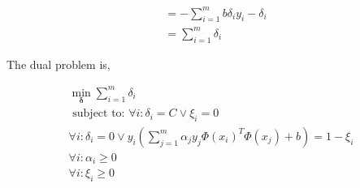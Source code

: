 \documentclass{article}
\begin{document}
\begin{align}
    \\
     & =
    -
    \sum_{i=1}^{m}
    b
    \delta_{i} y_i- \delta_i
    \\
     & =
    \sum_{i=1}^{m}
    \delta_i
\end{align}

The dual problem is,

\begin{equation}
    \begin{aligned}
        \min _{\boldsymbol{\delta}} \sum_{i=1}^{m} \delta_{i}                                     \\
        \text { subject to: }
        \forall i: \delta_i = C \vee \xi_{i}=0                                                    \\
        \forall i: \delta_{i}=0
        \vee
        y_{i}\left(\sum_{j=1}^{m} \alpha_{j} y_{j} \Phi(x_i)^T \Phi(x_j)  +b\right) = 1 - \xi_{i} \\
        \forall i: \alpha_{i} \geq 0                                                              \\
        \forall i: \xi_{i} \geq 0                                                                 \\
    \end{aligned}
\end{equation}
\end{document}
